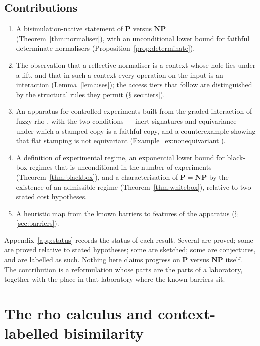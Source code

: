 \documentclass[11pt]{article}
\theoremstyle{definition}
\theoremstyle{plain}
\theoremstyle{remark}
\DeclareRobustCommand{\S}{\ifmmode\mathsection\else$\mathsection$\fi}
\newcommand{\Pclass}{\mathbf{P}}
\newcommand{\NPclass}{\mathbf{NP}}
\begin{document}
\subsection*{Contributions}

\begin{enumerate}[label=(\roman*),leftmargin=2.2em]
\item A bisimulation-native statement of $\Pclass$ versus $\NPclass$
(Theorem~\ref{thm:normaliser}), with an unconditional lower bound for
faithful determinate normalisers (Proposition~\ref{prop:determinate}).

\item The observation that a reflective normaliser is a context whose hole
lies under a lift, and that in such a context every operation on the
input is an interaction (Lemma~\ref{lem:uses}); the access tiers that
follow are distinguished by the structural rules they permit
(\S\ref{sec:tiers}).

\item An apparatus for controlled experiments built from the graded
interaction of fuzzy rho \cite{FuzzyRho}, with the two conditions ---
inert signatures and equivariance --- under which a stamped copy is a
faithful copy, and a counterexample showing that flat stamping is not
equivariant (Example~\ref{ex:nonequivariant}).

\item A definition of experimental regime, an exponential lower bound for
black-box regimes that is unconditional in the number of experiments
(Theorem~\ref{thm:blackbox}), and a
characterisation of $\Pclass = \NPclass$ by the existence of an
admissible regime (Theorem~\ref{thm:whitebox}), relative to two stated
cost hypotheses.

\item A heuristic map from the known barriers to features of the
apparatus (\S\ref{sec:barriers}).
\end{enumerate}

\noindent Appendix~\ref{app:status} records the status of each result.
Several are proved; some are proved relative to stated hypotheses; some
are sketched; some are conjectures, and are labelled as such. Nothing
here claims progress on $\Pclass$ versus $\NPclass$ itself. The
contribution is a reformulation whose parts are the parts of a
laboratory, together with the place in that laboratory where the known
barriers sit.

\section{The rho calculus and context-labelled bisimilarity}\label{sec:rho}
\end{document}
